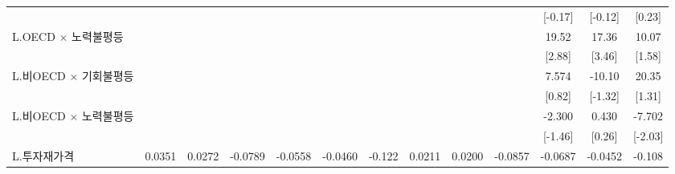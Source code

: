 \begin{table}[htbp]
{\begin{tabular}{l*{12}{c}}
                    &                     &                     &                     &                     &                     &                     &                     &                     &                     &     [-0.17]         &     [-0.12]         &      [0.23]         \\
\addlinespace
L.OECD $\times$ 노력불평등&                     &                     &                     &                     &                     &                     &                     &                     &                     &       19.52\sym{***}&       17.36\sym{***}&       10.07         \\
                    &                     &                     &                     &                     &                     &                     &                     &                     &                     &      [2.88]         &      [3.46]         &      [1.58]         \\
\addlinespace
L.비OECD $\times$ 기회불평등&                     &                     &                     &                     &                     &                     &                     &                     &                     &       7.574         &      -10.10         &       20.35         \\
                    &                     &                     &                     &                     &                     &                     &                     &                     &                     &      [0.82]         &     [-1.32]         &      [1.31]         \\
\addlinespace
L.비OECD $\times$ 노력불평등&                     &                     &                     &                     &                     &                     &                     &                     &                     &      -2.300         &       0.430         &      -7.702\sym{**} \\
                    &                     &                     &                     &                     &                     &                     &                     &                     &                     &     [-1.46]         &      [0.26]         &     [-2.03]         \\
\addlinespace
L.투자재가격        &      0.0351         &      0.0272         &     -0.0789         &     -0.0558         &     -0.0460         &      -0.122         &      0.0211         &      0.0200         &     -0.0857         &     -0.0687         &     -0.0452         &      -0.108         \\

\end{tabular}}
\end{table}
